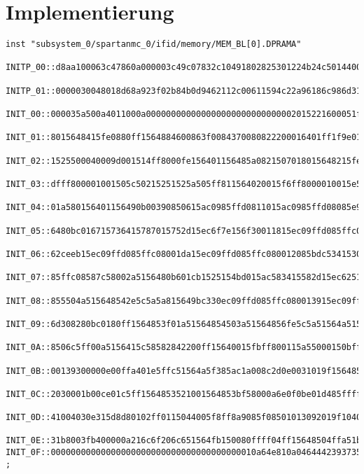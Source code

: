 \chapter{Implementierung}

\begin{lstlisting}
inst "subsystem_0/spartanmc_0/ifid/memory/MEM_BL[0].DPRAMA"
 INITP_00::d8aa100063c47860a000003c49c07832c10491802825301224b24c5014400024
 INITP_01::0000030048018d68a923f02b84b0d9462112c00611594c22a96186c986d31e03
  INIT_00::000035a500a4011000a000000000000000000000000000002015221600051f00
  INIT_01::8015648415fe0880ff1564884600863f0084370080822200016401ff1f9e012c
  INIT_02::1525500040009d001514ff8000fe156401156485a0821507018015648215fe01
  INIT_03::dfff800001001505c50215251525a505ff811564020015f6ff8000010015e50e
  INIT_04::01a580156401156490b00390850615ac0985ffd0811015ac0985ffd08085e915
  INIT_05::6480bc016715736415787015752d15ec6f7e156f30011815ec09ffd085ffc080
  INIT_06::62ceeb15ec09ffd085ffc08001da15ec09ffd085ffc080012085bdc534153015
  INIT_07::85ffc08587c58002a5156480b601cb1525154bd015ac583415582d15ec625115
  INIT_08::855504a515648542e5c5a5a815649bc330ec09ffd085ffc080013915ec09ffd0
  INIT_09::6d308280bc0180ff1564853f01a51564854503a51564856fe5c5a51564a51564
  INIT_0A::8506c5ff00a5156415c58582842200ff15640015fbff800115a55000150bff80
  INIT_0B::00139300000e00ffa401e5ffc51564a5f385ac1a008c2d0e0031019f15648537
  INIT_0C::2030001b00ce01c5ff1564853521001564853bf58000a6e0f0be01d485ffff21
  INIT_0D::41004030e315d8d80102ff0115044005f8ff8a9085f08501013092019f10408a
  INIT_0E::31b8003fb400000a216c6f206c651564fb150080ffff04ff15648504ffa51b00
INIT_0F::00000000000000000000000000000000000000010a64e810a046444239373533 ;
\end{lstlisting}
